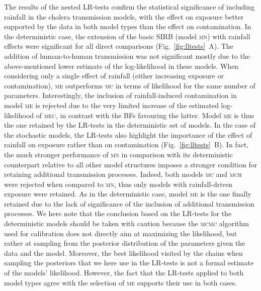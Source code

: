 The results of the nested LR-tests confirm the statistical significance of including rainfall in the cholera transmission models, with the effect on exposure better supported by the data in both model types than the effect on contamination. In the deterministic case, the extension of the basic SIRB (model \textsc{mn}) with rainfall effects were significant for all direct comparisons (Fig.~\ref{fig:lltests}~A). The addition of human-to-human transmission was not significant mostly due to the above-mentioned lower estimate of the log-likelihood in these models. When considering only a single effect of rainfall (either increasing exposure or contamination), \textsc{me} outperforms \textsc{mc} in terms of likelihood for the same number of parameters. Interestingly, the inclusion of rainfall-induced contamination in model \textsc{me} is rejected due to the very limited increase of the estimated log-likelihood of \textsc{mec}, in contrast with the BFs favouring the latter. Model \textsc{me} is thus the one retained by the LR-tests in the deterministic set of models. In the case of the stochastic models, the LR-tests also highlight the importance of the effect of rainfall on exposure rather than on contamination (Fig.~\ref{fig:lltests}~B). In fact, the much stronger performance of \textsc{mn} in comparison with its deterministic counterpart relative to all other model structures imposes a stronger condition for retaining additional transmission processes. Indeed, both models \textsc{mc} and \textsc{mch} were rejected when compared to \textsc{mn}, thus only models with rainfall-driven exposure were retained. As in the deterministic case, model \textsc{me} is the one finally retained due to the lack of significance of the inclusion of additional transmission processes. We here note that the conclusion based on the LR-tests for the deterministic models should be taken with caution because the \textsc{mcmc} algorithm used for calibration does not directly aim at maximizing the likelihood, but rather at sampling from the posterior distribution of the parameters given the data and the model. Moreover, the best likelihood visited by the chains when sampling the posteriors that we here use in the LR-tests is not a formal estimate of the models' likelihood. However, the fact that the LR-tests applied to both model types agree with the selection of \textsc{me} supports their use in both cases.

